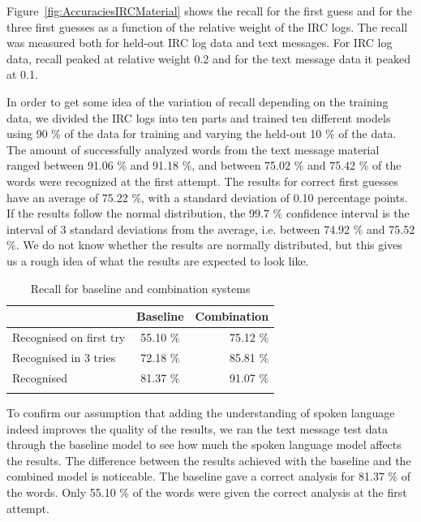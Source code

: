 \documentclass[a4paper,conference]{IEEEtran}
\begin{document}
Figure~\ref{fig:AccuraciesIRCMaterial} shows the recall for the first
guess and for the three first guesses as a function of the relative
weight of the IRC logs. The recall was measured both for held-out
IRC log data and text messages. For IRC log data, recall peaked
at relative weight 0.2 and for the text message data it peaked at 0.1.

In order to get some idea of the variation of recall depending on the
training data, we divided the IRC logs into ten parts and trained ten
different models using 90 \% of the data for training and varying the
held-out 10 \% of the data. The amount of successfully analyzed words
from the text message material ranged between 91.06 \% and 91.18 \%,
and between 75.02 \% and 75.42 \% of the words were recognized at the
first attempt. The results for correct first guesses have an average
of 75.22 \%, with a standard deviation of 0.10 percentage points. If
the results follow the normal distribution, the 99.7 \% confidence
interval is the interval of 3 standard deviations from the average,
i.e. between 74.92 \% and 75.52 \%. We do not know whether the results
are normally distributed, but this gives us a rough idea of what the
results are expected to look like.

\begin{table}[!t]
\caption{Recall for baseline and combination systems}
\begin{center}
\begin{tabular} {l c r}
 & Baseline & Combination \\
 \hline
Recognised on first try \rule{0pt}{2.6ex} & 55.10 \% & 75.12 \% \\
Recognised in 3 tries & 72.18 \% & 85.81 \% \\
Recognised & 81.37 \% & 91.07 \% \\
\hline
 & & \\
\end{tabular}
\end{center}
\label{tab:recall}
\end{table}


To confirm our assumption that adding the understanding of spoken
language indeed improves the quality of the results, we ran the text
message test data through the baseline model to see how much the
spoken language model affects the results. The difference between the
results achieved with the baseline and the combined model is
noticeable. The baseline gave a correct analysis for 81.37 \% of the
words. Only 55.10 \% of the words were given the correct analysis at
the first attempt.
\end{document}
